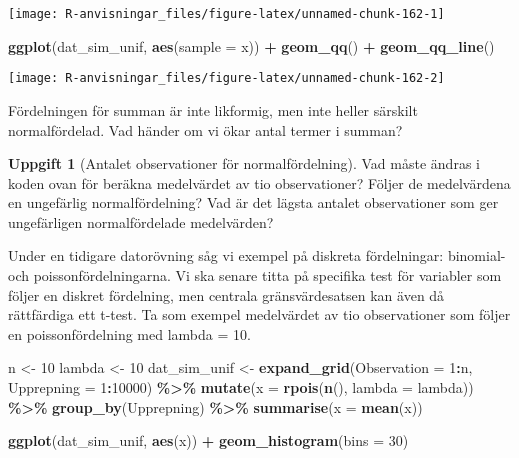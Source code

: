 \documentclass[
]{book}
\newenvironment{Shaded}{\begin{snugshade}}{\end{snugshade}}
\newcommand{\AttributeTok}[1]{\textcolor[rgb]{0.13,0.29,0.53}{#1}}
\newcommand{\DecValTok}[1]{\textcolor[rgb]{0.00,0.00,0.81}{#1}}
\newcommand{\FunctionTok}[1]{\textcolor[rgb]{0.13,0.29,0.53}{\textbf{#1}}}
\newcommand{\NormalTok}[1]{#1}
\newcommand{\OtherTok}[1]{\textcolor[rgb]{0.56,0.35,0.01}{#1}}
\newcommand{\SpecialCharTok}[1]{\textcolor[rgb]{0.81,0.36,0.00}{\textbf{#1}}}
\theoremstyle{definition}
\theoremstyle{definition}
\theoremstyle{definition}
\newtheorem{exercise}{Uppgift}[chapter]
\theoremstyle{definition}
\theoremstyle{remark}
\begin{document}
\begin{center}\texttt{[image: R-anvisningar\_files/figure-latex/unnamed-chunk-162-1]} \end{center}

\begin{Shaded}
\begin{Highlighting}[]
\FunctionTok{ggplot}\NormalTok{(dat\_sim\_unif, }\FunctionTok{aes}\NormalTok{(}\AttributeTok{sample =}\NormalTok{ x)) }\SpecialCharTok{+} \FunctionTok{geom\_qq}\NormalTok{() }\SpecialCharTok{+} \FunctionTok{geom\_qq\_line}\NormalTok{()}
\end{Highlighting}
\end{Shaded}

\begin{center}\texttt{[image: R-anvisningar\_files/figure-latex/unnamed-chunk-162-2]} \end{center}

Fördelningen för summan är inte likformig, men inte heller särskilt normalfördelad. Vad händer om vi ökar antal termer i summan?

\begin{exercise}[Antalet observationer för normalfördelning]
Vad måste ändras i koden ovan för beräkna medelvärdet av tio observationer? Följer de medelvärdena en ungefärlig normalfördelning? Vad är det lägsta antalet observationer som ger ungefärligen normalfördelade medelvärden?
\end{exercise}

Under en tidigare datorövning såg vi exempel på diskreta fördelningar: binomial- och poissonfördelningarna. Vi ska senare titta på specifika test för variabler som följer en diskret fördelning, men centrala gränsvärdesatsen kan även då rättfärdiga ett t-test. Ta som exempel medelvärdet av tio observationer som följer en poissonfördelning med lambda = 10.

\begin{Shaded}
\begin{Highlighting}[]
\NormalTok{n }\OtherTok{\textless{}{-}} \DecValTok{10}
\NormalTok{lambda }\OtherTok{\textless{}{-}} \DecValTok{10}
\NormalTok{dat\_sim\_unif }\OtherTok{\textless{}{-}} \FunctionTok{expand\_grid}\NormalTok{(}\AttributeTok{Observation =} \DecValTok{1}\SpecialCharTok{:}\NormalTok{n, }\AttributeTok{Upprepning =} \DecValTok{1}\SpecialCharTok{:}\DecValTok{10000}\NormalTok{) }\SpecialCharTok{\%\textgreater{}\%} 
  \FunctionTok{mutate}\NormalTok{(}\AttributeTok{x =} \FunctionTok{rpois}\NormalTok{(}\FunctionTok{n}\NormalTok{(), }\AttributeTok{lambda =}\NormalTok{ lambda)) }\SpecialCharTok{\%\textgreater{}\%} 
  \FunctionTok{group\_by}\NormalTok{(Upprepning) }\SpecialCharTok{\%\textgreater{}\%} 
  \FunctionTok{summarise}\NormalTok{(}\AttributeTok{x =} \FunctionTok{mean}\NormalTok{(x))}

\FunctionTok{ggplot}\NormalTok{(dat\_sim\_unif, }\FunctionTok{aes}\NormalTok{(x)) }\SpecialCharTok{+} \FunctionTok{geom\_histogram}\NormalTok{(}\AttributeTok{bins =} \DecValTok{30}\NormalTok{)}
\end{Highlighting}
\end{Shaded}
\end{document}
